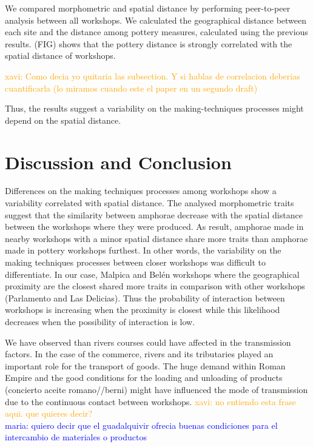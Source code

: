\documentclass[review]{elsarticle}
\newcommand{\memo}[2]{\textcolor{#1}{#2}}
\newcommand{\xavi}[1]{\memo{orange}{xavi: #1\\}}
\newcommand{\maria}[1]{\memo{blue}{maria: #1\\}}
\begin{document}
We compared morphometric and spatial distance by performing peer-to-peer analysis between all workshops. We calculated the geographical distance between each site and the distance among pottery measures, calculated using the previous results. (FIG) shows that the pottery distance is strongly correlated with the spatial distance of workshops.


\xavi{Como decia yo quitaria las subsection. Y si hablas de correlacion deberias cuantificarla (lo miramos cuando este el paper en un segundo draft)}



Thus, the results suggest a variability on the making-techniques processes might depend on the spatial distance.  

\section{Discussion and Conclusion}


Differences on the making techniques processes among workshops show a variability correlated with spatial distance. The analysed morphometric traits suggest that the similarity between amphorae decrease with the spatial distance between the workshops where they were produced. As result, amphorae made in nearby workshops with a minor spatial distance share more traits than amphorae made in pottery workshops furthest. In other words, the variability on the making techniques processes between closer workshops was difficult to differentiate. In our case, Malpica and Bel\'en workshops where the geographical proximity are the closest shared more traits in comparison with other workshops (Parlamento and Las Delicias). Thus the probability of interaction between workshops is increasing when the proximity is closest while this likelihood decreases when the possibility of interaction is low. 

We have observed than rivers courses could have affected in the transmission factors. In the case of the commerce, rivers and its tributaries played an important role for the transport of goods. The huge demand within Roman Empire and the good conditions for the loading and unloading of products (concierto aceite romano//berni) might have influenced the mode of transmission due to the continuous contact between workshops. \xavi{no entiendo esta frase aqui. que quieres decir?} 
\maria{quiero decir que el guadalquivir ofrecia buenas condiciones para el intercambio de materiales o productos}
\end{document}
